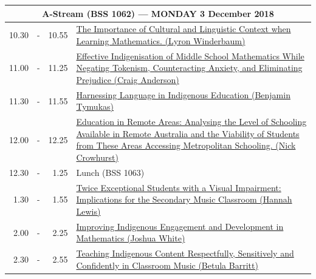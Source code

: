 \documentclass[twoside,12pt,a4paper,notitlepage]{memoir}
\begin{document}
\pagebreak
\begin{center}
\begin{tabular}{rcr|p{10.8cm}}
 \multicolumn{4}{c}{{\large A-Stream (BSS 1062) --- MONDAY 3 December 2018}} \\ \hline
 10.30 & - & 10.55 & 
 \hyperref[aut:winderbaum]{The Importance of Cultural and Linguistic Context when Learning Mathematics. (Lyron Winderbaum)} \\ \hline
11.00 & - & 11.25 &
 \hyperref[aut:anderson]{Effective Indigenisation of Middle School Mathematics While Negating Tokenism, Counteracting Anxiety, and Eliminating Prejudice (Craig Anderson)} \\ \hline
11.30 & - & 11.55 &
 \hyperref[aut:tymukas]{Harnessing Language in Indigenous Education (Benjamin Tymukas)} \\ \hline
12.00 & - & 12.25 &
 \hyperref[aut:crowhurst]{Education in Remote Areas: Analysing the Level of Schooling Available in Remote Australia and the Viability of Students from These Areas Accessing Metropolitan Schooling. (Nick Crowhurst)}  \\ \hline
12.30 & - & 1.25 & Lunch (BSS 1063) \\ \hline
1.30 & - & 1.55 &
 \hyperref[aut:lewis]{Twice Exceptional Students with a Visual Impairment: Implications for the Secondary Music Classroom (Hannah Lewis)} \\ \hline
2.00 & - & 2.25 &
 \hyperref[aut:white]{Improving Indigenous Engagement and Development in Mathematics (Joshua White)} \\ \hline
2.30 & - & 2.55 &
 \hyperref[aut:barritt]{Teaching Indigenous Content Respectfully, Sensitively and Confidently in Classroom Music (Betula Barritt)} \\ \hline
\end{tabular}
\end{center}
\end{document}
